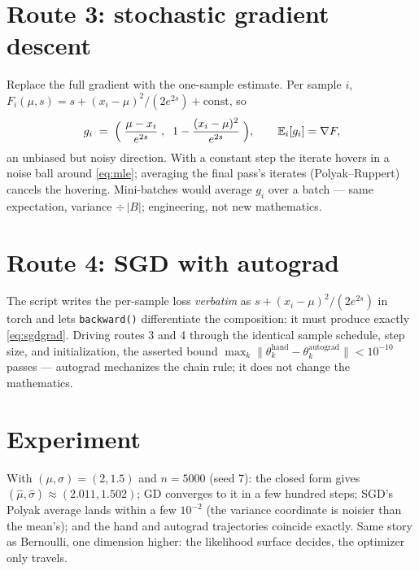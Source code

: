 \documentclass[11pt]{article}
\begin{document}
\section{Route 3: stochastic gradient descent}

Replace the full gradient with the one-sample estimate. Per sample $i$,
$F_i(\mu,s) = s + (x_i-\mu)^2/(2e^{2s}) + \mathrm{const}$, so
\begin{equation}
  g_i \;=\; \Bigl(\;\frac{\mu - x_i}{e^{2s}}\;,\;\;
             1 - \frac{(x_i-\mu)^2}{e^{2s}}\;\Bigr),
  \qquad \mathbb{E}_i[g_i] = \nabla F ,
  \label{eq:sgdgrad}
\end{equation}
an unbiased but noisy direction. With a constant step the iterate hovers
in a noise ball around \eqref{eq:mle}; averaging the final pass's iterates
(Polyak--Ruppert) cancels the hovering. Mini-batches would average $g_i$
over a batch — same expectation, variance $\div\,|B|$; engineering, not
new mathematics.

\section{Route 4: SGD with autograd}

The script writes the per-sample loss \emph{verbatim} as
$s + (x_i-\mu)^2/(2e^{2s})$ in torch and lets \texttt{backward()}
differentiate the composition: it must produce exactly
\eqref{eq:sgdgrad}. Driving routes 3 and 4 through the identical sample
schedule, step size, and initialization, the asserted bound
$\max_k \lVert\theta_k^{\text{hand}} - \theta_k^{\text{autograd}}\rVert
< 10^{-10}$ passes — autograd mechanizes the chain rule; it does not
change the mathematics.

\section{Experiment}

With $(\mu,\sigma) = (2, 1.5)$ and $n = 5000$ (seed 7): the closed form
gives $(\hat\mu,\hat\sigma) \approx (2.011, 1.502)$; GD converges to it in
a few hundred steps; SGD's Polyak average lands within a few $10^{-2}$
(the variance coordinate is noisier than the mean's); and the hand and
autograd trajectories coincide exactly. Same story as Bernoulli, one
dimension higher: the likelihood surface decides, the optimizer only
travels.
\end{document}
